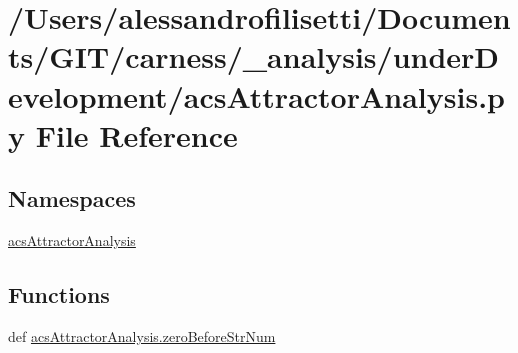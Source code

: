 \hypertarget{a00039}{\section{/\-Users/alessandrofilisetti/\-Documents/\-G\-I\-T/carness/\-\_\-analysis/under\-Development/acs\-Attractor\-Analysis.py File Reference}
\label{a00039}
}
\subsection*{Namespaces}
\begin{DoxyCompactItemize}
\item 
\hyperlink{a00096}{acs\-Attractor\-Analysis}
\end{DoxyCompactItemize}
\subsection*{Functions}
\begin{DoxyCompactItemize}
\item 
def \hyperlink{a00096_a97aba03091fd66dde4375e3dbffdbede}{acs\-Attractor\-Analysis.\-zero\-Before\-Str\-Num}
\end{DoxyCompactItemize}
